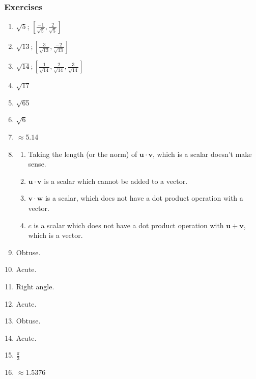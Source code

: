 \documentclass{article}
\begin{document}
\subsubsection*{Exercises}
\begin{enumerate}
  \item $\sqrt{5}$; $\left[\frac{-1}{\sqrt{5}}, \frac{2}{\sqrt{5}}\right]$
  \item $\sqrt{13}; \left[\frac{3}{\sqrt{13}}, \frac{-2}{\sqrt{13}}\right]$
  \item $\sqrt{14}; \left[\frac{1}{\sqrt{14}}, \frac{2}{\sqrt{14}}, \frac{3}{\sqrt{14}}\right]$
    \setcounter{enumi}{12}
  \item $\sqrt{17}$
  \item $\sqrt{65}$
  \item $\sqrt{6}$
  \item $\approx5.14$
  \item
    \begin{enumerate}
      \item Taking the length (or the norm) of $\mathbf{u}\cdot\mathbf{v}$, which is a scalar
        doesn't make sense.
      \item $\mathbf{u}\cdot\mathbf{v}$ is a scalar which cannot be added to a vector.
      \item $\mathbf{v}\cdot\mathbf{w}$ is a scalar, which does not have a dot product operation
        with a vector.
      \item $c$ is a scalar which does not have a dot product operation with $\mathbf{u}+
        \mathbf{v}$, which is a vector.
    \end{enumerate}
  \item Obtuse.
  \item Acute.
  \item Right angle.
  \item Acute.
  \item Obtuse.
  \item Acute.
    \setcounter{enumi}{24}
  \item $\frac{\pi}{3}$
    \setcounter{enumi}{26}
  \item $\approx1.5376$

\end{enumerate}
\end{document}
